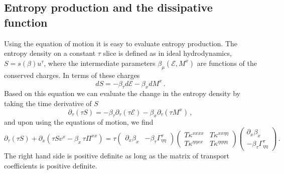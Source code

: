 \documentclass[12pt,aps,preprint,nofootinbib,noshowkeys,noshowpacs,longbibliography,superscriptaddress,tightenlines]{revtex4-2}
\def\edense{{\mathcal{E}}}
\def\pdense{M}
\def\st{\begin{equation}}
\def\stp{\end{equation}}
\def\tideal{{\mathcal T}}
\begin{document}


\subsection{Entropy production and the dissipative function}

Using the equation of motion it is easy to evaluate entropy production. 
The entropy density on a constant $\tau$ slice  is defined as in ideal hydrodynamics,  $S
= s(\beta) u^\tau$,  where the intermediate parameters $\beta_{\mu}(\edense,
\pdense^x)$ are functions of the conserved charges.  In
terms of these charges
\st
dS = -\beta_\tau d\edense  - \beta_x d\pdense^x \, .
\stp
Based on this equation we can evaluate the change in the entropy density by taking the time derivative of $S$ 
\st
 \partial_\tau (\tau S) = -\beta_{\tau} \partial_\tau (\tau \edense)  -\beta_x  \partial_\tau(\tau \pdense^x)\, , 
\stp
and upon using the equations of motion, we find
\st
\partial_\tau( \tau S)  + \partial_x (\tau S v^x -  \beta_x \, \tau \Pi^{xx}) =  \tau 
\begin{pmatrix}
  \partial_x \beta_x   &   -\beta_\tau \Gamma^{\tau}_{\eta\eta}
\end{pmatrix}
\begin{pmatrix}
  T\kappa^{xxxx}  &  T \kappa^{xx\eta\eta} \\
  T \kappa^{\eta\eta xx} & T  \kappa^{\eta\eta\eta\eta} 
\end{pmatrix}
\begin{pmatrix}
  \partial_x \beta_x   \\    -\beta_\tau \Gamma^{\tau}_{\eta\eta}   
\end{pmatrix} \, .
\stp
The right hand side is positive definite as long as the matrix of transport coefficients is positive definite. 
\end{document}
